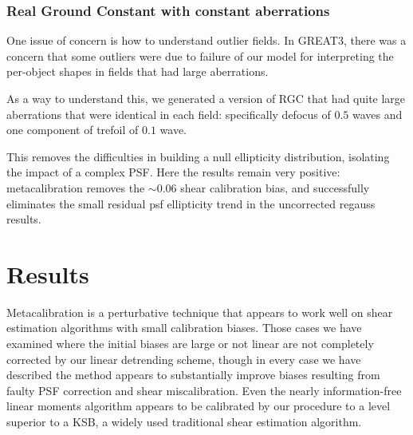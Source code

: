 \documentclass[iop]{emulateapj}
\begin{document}
\subsubsection{Real Ground Constant with constant aberrations}

One issue of concern is how to understand outlier fields.  In GREAT3,
there was a concern that some outliers were due to failure of our
model for interpreting the per-object shapes in fields that had large
aberrations.

As a way to understand this, we generated a version of RGC that had
quite large aberrations that were identical in each field:
specifically defocus of $0.5$ waves and one component of trefoil of
$0.1$ wave.

This removes the difficulties in building a null ellipticity
distribution, isolating the impact of a complex PSF. Here the results
remain very positive: metacalibration removes the $\sim0.06$ shear
calibration bias, and successfully eliminates the small residual psf
ellipticity trend in the uncorrected regauss results.


\section{Results}
Metacalibration is a perturbative technique that appears to work well
on shear estimation algorithms with small calibration biases. Those
cases we have examined where the initial biases are large or not
linear are not completely corrected by our linear detrending scheme,
though in every case we have described the method appears to
substantially improve biases resulting from faulty PSF correction and
shear miscalibration. Even the nearly information-free linear moments
algorithm appears to be calibrated by our procedure to a level
superior to a KSB, a widely used traditional shear estimation algorithm.
\end{document}

